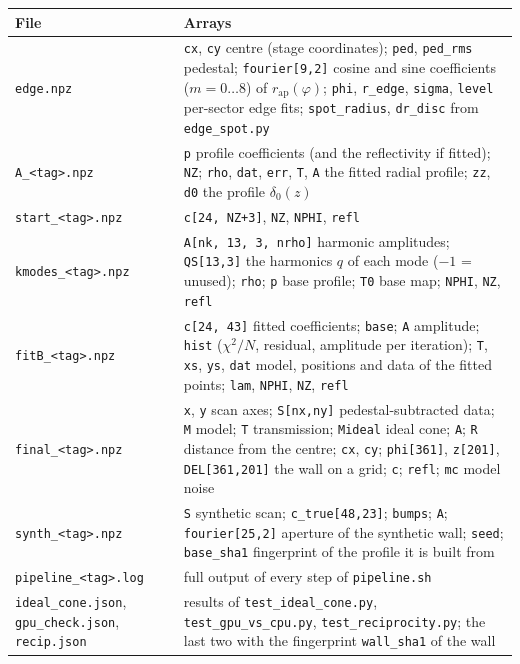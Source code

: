 \documentclass[11pt,a4paper]{article}
\newcommand{\code}[1]{\texttt{#1}}
\begin{document}
\begin{tabularx}{\textwidth}{@{}L{3.5cm}Y@{}}
\toprule
File & Arrays \\
\midrule
\code{edge.npz} & \code{cx}, \code{cy} centre (stage coordinates); \code{ped}, \code{ped\_rms}
pedestal; \code{fourier[9,2]} cosine and sine coefficients ($m=0\ldots8$) of $r_\mathrm{ap}(\varphi)$;
\code{phi}, \code{r\_edge}, \code{sigma}, \code{level} per-sector edge fits; \code{spot\_radius},
\code{dr\_disc} from \code{edge\_spot.py} \\
\code{A\_<tag>.npz} & \code{p} profile coefficients (and the reflectivity if fitted); \code{NZ};
\code{rho}, \code{dat}, \code{err}, \code{T}, \code{A} the fitted radial profile; \code{zz},
\code{d0} the profile $\delta_0(z)$ \\
\code{start\_<tag>.npz} & \code{c[24, NZ+3]}, \code{NZ}, \code{NPHI}, \code{refl} \\
\code{kmodes\_<tag>.npz} & \code{A[nk, 13, 3, nrho]} harmonic amplitudes; \code{QS[13,3]} the
harmonics $q$ of each mode ($-1$ = unused); \code{rho}; \code{p} base profile; \code{T0} base map;
\code{NPHI}, \code{NZ}, \code{refl} \\
\code{fitB\_<tag>.npz} & \code{c[24, 43]} fitted coefficients; \code{base}; \code{A} amplitude;
\code{hist} ($\chi^2/N$, residual, amplitude per iteration); \code{T}, \code{xs}, \code{ys},
\code{dat} model, positions and data of the fitted points; \code{lam}, \code{NPHI}, \code{NZ},
\code{refl} \\
\code{final\_<tag>.npz} & \code{x}, \code{y} scan axes; \code{S[nx,ny]} pedestal-subtracted data;
\code{M} model; \code{T} transmission; \code{Mideal} ideal cone; \code{A}; \code{R} distance from the
centre; \code{cx}, \code{cy}; \code{phi[361]}, \code{z[201]}, \code{DEL[361,201]} the wall on a grid;
\code{c}; \code{refl}; \code{mc} model noise \\
\code{synth\_<tag>.npz} & \code{S} synthetic scan; \code{c\_true[48,23]}; \code{bumps}; \code{A};
\code{fourier[25,2]} aperture of the synthetic wall; \code{seed}; \code{base\_sha1} fingerprint of the
profile it is built from \\
{\small\code{pipeline\_<tag>.log}} & full output of every step of \code{pipeline.sh} \\
\code{ideal\_cone.json}, \code{gpu\_check.json}, \code{recip.json} & results of
\code{test\_ideal\_cone.py}, \code{test\_gpu\_vs\_cpu.py}, \code{test\_reciprocity.py}; the last two
with the fingerprint \code{wall\_sha1} of the wall \\

\end{tabularx}
\end{document}
